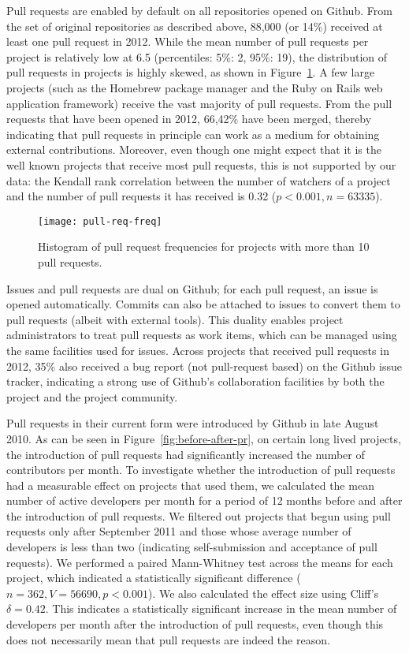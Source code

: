 \documentclass{sig-alternate}
\begin{document}
Pull requests are enabled by default on all repositories opened on Github.  From
the set of original repositories as described above, 88,000 (or 14\%) received
at least one pull request in 2012.  While the mean number of pull requests per
project is relatively low at 6.5 (percentiles: 5\%: 2, 95\%: 19), the
distribution of pull requests in projects is highly skewed, as shown in
Figure~\ref{fig:prfreq}.  A few large projects (such as the Homebrew package
manager and the Ruby on Rails web application framework) receive the vast
majority of pull requests. From the pull requests that have been opened in
2012, 66,42\% have been merged, thereby indicating that pull requests in
principle can work as a medium for obtaining external contributions.  Moreover,
even though one might expect that it is the well known projects that receive
most pull requests, this is not supported by our data: the Kendall rank
correlation between the number of watchers of a project and the number of pull
requests it has received is 0.32 ($p < 0.001, n = 63335$).

\begin{figure}
  \begin{center}
    \texttt{[image: pull-req-freq]}
  \end{center}
  \caption{Histogram of pull request frequencies for projects with more than
  10 pull requests.}
  \label{fig:prfreq}
\end{figure}

Issues and pull requests are dual on Github; for each pull request, an issue is
opened automatically. Commits can also be attached to issues to convert them to
pull requests (albeit with external tools). This duality enables project
administrators to treat pull requests as work items, which can be managed using
the same facilities used for issues. Across projects that received pull
requests in 2012, 35\% also received a bug report (not pull-request based) 
on the Github issue tracker, indicating a strong use of Github's collaboration
facilities by both the project and the project community.

Pull requests in their current form were introduced by Github in late August
2010.  As can be seen in Figure~\ref{fig:before-after-pr}, on certain long lived
projects, the introduction of pull requests had significantly increased the
number of contributors per month. To investigate whether the introduction of
pull requests had a measurable effect on projects that used them, we calculated
the mean number of active developers per month for a period of 12 months before
and after the introduction of pull requests. We filtered out projects that begun
using pull requests only after September 2011 and those whose average number of
developers is less than two (indicating self-submission and acceptance of pull
requests). We performed a paired Mann-Whitney test across the means for each
project, which indicated a statistically significant difference ($n = 362, V =
56690, p < 0.001$). We also calculated the effect size using Cliff's $\delta =
0.42$. This indicates a statistically significant increase in the mean number of
developers per month after the introduction of pull requests, even though this
does not necessarily mean that pull requests are indeed the reason.
\end{document}
